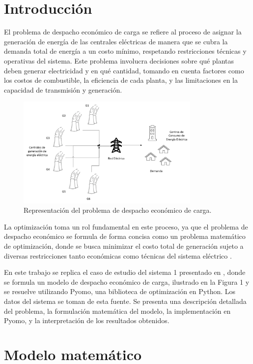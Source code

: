 \documentclass[11pt]{article}
\begin{document}
\section{Introducción}	
El problema de despacho económico de carga se refiere al proceso de asignar la generación de energía de las centrales eléctricas de manera que se cubra la demanda total de energía a un costo mínimo, respetando restricciones técnicas y operativas del sistema. Este problema involucra decisiones sobre qué plantas deben generar electricidad y en qué cantidad, tomando en cuenta factores como los costos de combustible, la eficiencia de cada planta, y las limitaciones en la capacidad de transmisión y generación.

\begin{figure}[h!]
    \centering
    \includegraphics[width=0.8\textwidth]{economic-dispatch.png}
    \caption{Representación del problema de despacho económico de carga.}
    \label{fig:economic_dispatch}
\end{figure}

La optimización toma un rol fundamental en este proceso, ya que el problema de despacho económico se formula de forma concisa como un problema matemático de optimización, donde se busca minimizar el costo total de generación sujeto a diversas restricciones tanto económicas como técnicas del sistema eléctrico \citep{osti_6202356}.

En este trabajo se replica el caso de estudio del sistema 1 presentado en \citep{electronics9010108}, donde se formula un modelo de despacho económico de carga, ilustrado en la Figura 1 y se resuelve utilizando Pyomo, una biblioteca de optimización en Python. Los datos del sistema se toman de esta fuente. Se presenta una descripción detallada del problema, la formulación matemática del modelo, la implementación en Pyomo, y la interpretación de los resultados obtenidos.
\newpage
\section{Modelo matemático}
\end{document}
